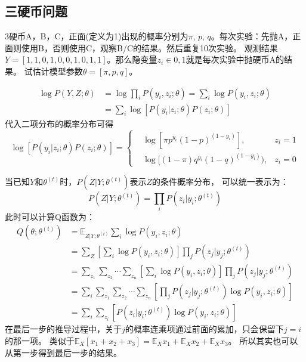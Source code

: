 \subsection{三硬币问题}
3硬币A，B，C，正面(定义为1)出现的概率分别为$\pi$, $p$, $q$。每次实验：先抛A，正面则使用B，否则使用C，观察B/C的结果。然后重复10次实验。
观测结果$Y=[1,1,0,1,0,0,1,0,1,1]$。那么隐变量$z_i \in {0, 1}$就是每次实验中抛硬币A的结果。
试估计模型参数$\theta = [\pi, p, q]$。

\begin{align*}
    \log P(Y,Z; \theta) &= \log \prod_i P(y_i, z_i; \theta) = \sum_i \log P(y_i, z_i; \theta) \\
    &= \sum_i \log [ P(y_i|z_i; \theta) P(z_i; \theta) ]
\end{align*}
代入二项分布的概率分布可得
\begin{equation*}
\log [ P(y_i|z_i; \theta) P(z_i; \theta) ] = \left\{
    \begin{aligned}
        & \log[\pi p^{y_i}(1-p)^{(1-y_i)}] , & z_i =1 \\
        & \log[(1-\pi)q^{y_i}(1-q)^{(1-y_i)}), & z_i =0
    \end{aligned}
    \right.
\end{equation*}

当已知$Y$和$\theta^{(t)}$时，$P(Z|Y; \theta^{(t)})$表示$Z$的条件概率分布，
可以统一表示为：
\begin{equation*}
    P(Z|Y; \theta^{(t)}) = \prod_i P(z_i|y_i; \theta^{(t)})
\end{equation*}
此时可以计算Q函数为：
\begin{align*}
    Q(\theta; \theta^{(t)}) &= \mathbb{E}_{Z|Y; \theta^{(t)}} \sum_i \log P(y_i,z_i;\theta) \\
    &= \sum_Z \left[ \sum_i \log P(y_i,z_i;\theta) \right] \prod_j P(z_j|y_j; \theta^{(t)}) \\
    &= \sum_{z_1} \sum_{z_2} \cdots \sum_{z_n} \left[ \sum_i \log P(y_i,z_i;\theta) \right] \prod_j P(z_j|y_j; \theta^{(t)}) \\
    &= \sum_i \sum_{z_1} \sum_{z_2} \cdots \sum_{z_n} \left[ \prod_j P(z_j|y_j; \theta^{(t)}) \log P(y_i,z_i;\theta) \right] \\
    &= \sum_i \sum_{z_i} \left[P(z_i|y_i; \theta^{(t)}) \log P(y_i,z_i;\theta) \right]
\end{align*}
在最后一步的推导过程中，关于$j$的概率连乘项通过前面的累加，只会保留下$j=i$的那一项。
类似于$\mathbb{E}_{X}[x_1+x_2+x_3] = \mathbb{E}_{X} x_1 + \mathbb{E}_{X} x_2 + \mathbb{E}_{X} x_3$。
所以其实也可以从第一步得到最后一步的结果。

